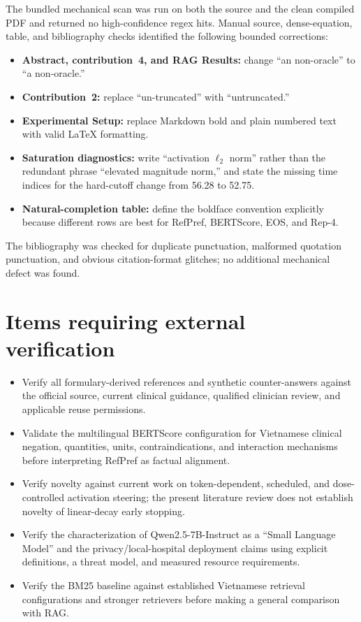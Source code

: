\documentclass[11pt]{article}
\begin{document}
The bundled mechanical scan was run on both the source and the clean compiled PDF and returned no high-confidence regex hits.  Manual source, dense-equation, table, and bibliography checks identified the following bounded corrections:

\begin{itemize}
    \item \textbf{Abstract, contribution~4, and RAG Results:} change ``an non-oracle'' to ``a non-oracle.''
    \item \textbf{Contribution~2:} replace ``un-truncated'' with ``untruncated.''
    \item \textbf{Experimental Setup:} replace Markdown bold and plain numbered text with valid LaTeX formatting.
    \item \textbf{Saturation diagnostics:} write ``activation $\ell_2$ norm'' rather than the redundant phrase ``elevated magnitude norm,'' and state the missing time indices for the hard-cutoff change from 56.28 to 52.75.
    \item \textbf{Natural-completion table:} define the boldface convention explicitly because different rows are best for RefPref, BERTScore, EOS, and Rep-4.
\end{itemize}

The bibliography was checked for duplicate punctuation, malformed quotation punctuation, and obvious citation-format glitches; no additional mechanical defect was found.

\section*{Items requiring external verification}

\begin{itemize}
    \item Verify all formulary-derived references and synthetic counter-answers against the official source, current clinical guidance, qualified clinician review, and applicable reuse permissions.
    \item Validate the multilingual BERTScore configuration for Vietnamese clinical negation, quantities, units, contraindications, and interaction mechanisms before interpreting RefPref as factual alignment.
    \item Verify novelty against current work on token-dependent, scheduled, and dose-controlled activation steering; the present literature review does not establish novelty of linear-decay early stopping.
    \item Verify the characterization of Qwen2.5-7B-Instruct as a ``Small Language Model'' and the privacy/local-hospital deployment claims using explicit definitions, a threat model, and measured resource requirements.
    \item Verify the BM25 baseline against established Vietnamese retrieval configurations and stronger retrievers before making a general comparison with RAG.
\end{itemize}
\end{document}
